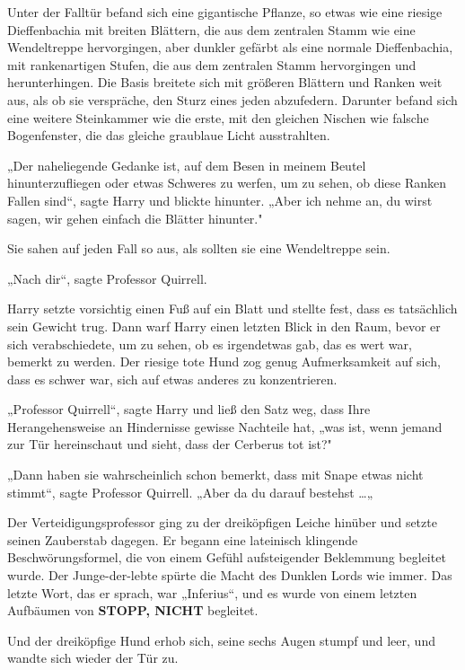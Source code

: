 {Unter der Falltür befand sich eine gigantische Pflanze, so etwas wie eine riesige Dieffenbachia mit breiten Blättern, die aus dem zentralen Stamm wie eine Wendeltreppe hervorgingen, aber dunkler gefärbt als eine normale Dieffenbachia, mit rankenartigen Stufen, die aus dem zentralen Stamm hervorgingen und herunterhingen. Die Basis breitete sich mit größeren Blättern und Ranken weit aus, als ob sie verspräche, den Sturz eines jeden abzufedern. Darunter befand sich eine weitere Steinkammer wie die erste, mit den gleichen Nischen wie falsche Bogenfenster, die das gleiche graublaue Licht ausstrahlten.

„Der naheliegende Gedanke ist, auf dem Besen in meinem Beutel hinunterzufliegen oder etwas Schweres zu werfen, um zu sehen, ob diese Ranken Fallen sind“, sagte Harry und blickte hinunter. „Aber ich nehme an, du wirst sagen, wir gehen einfach die Blätter hinunter."

Sie sahen auf jeden Fall so aus, als sollten sie eine Wendeltreppe sein.

„Nach dir“, sagte Professor Quirrell.

Harry setzte vorsichtig einen Fuß auf ein Blatt und stellte fest, dass es tatsächlich sein Gewicht trug. Dann warf Harry einen letzten Blick in den Raum, bevor er sich verabschiedete, um zu sehen, ob es irgendetwas gab, das es wert war, bemerkt zu werden. Der riesige tote Hund zog genug Aufmerksamkeit auf sich, dass es schwer war, sich auf etwas anderes zu konzentrieren.

„Professor Quirrell“, sagte Harry und ließ den Satz weg, dass Ihre Herangehensweise an Hindernisse gewisse Nachteile hat, „was ist, wenn jemand zur Tür hereinschaut und sieht, dass der Cerberus tot ist?"

„Dann haben sie wahrscheinlich schon bemerkt, dass mit Snape etwas nicht stimmt“, sagte Professor Quirrell. „Aber da du darauf bestehst …„

Der Verteidigungsprofessor ging zu der dreiköpfigen Leiche hinüber und setzte seinen Zauberstab dagegen. Er begann eine lateinisch klingende Beschwörungsformel, die von einem Gefühl aufsteigender Beklemmung begleitet wurde. Der Junge-der-lebte spürte die Macht des Dunklen Lords wie immer. Das letzte Wort, das er sprach, war „Inferius“, und es wurde von einem letzten Aufbäumen von \textbf{STOPP, NICHT} begleitet.

Und der dreiköpfige Hund erhob sich, seine sechs Augen stumpf und leer, und wandte sich wieder der Tür zu.

}
